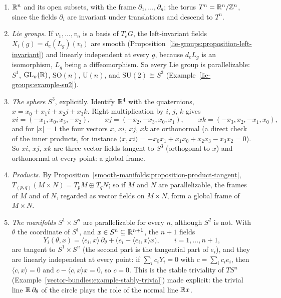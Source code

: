 \begin{example}\label{vector-bundles:example-parallelizable}
\begin{enumerate}
\item $\mathbb{R}^n$ and its open subsets, with the frame $\partial_1, \ldots, \partial_n$; the torus $T^n = \mathbb{R}^n/\mathbb{Z}^n$, since the fields $\partial_i$ are invariant under translations and descend to $T^n$.
\item \emph{Lie groups.} If $v_1, \ldots, v_n$ is a basis of $T_eG$, the left-invariant fields $X_i(g) = d_e(L_g)(v_i)$ are smooth (Proposition~\ref{lie-groups:proposition-left-invariant}) and linearly independent at every
$g$, because $d_eL_g$ is an isomorphism, $L_g$ being a diffeomorphism. So every Lie group is parallelizable: $S^1$, $\mathrm{GL}_n(\mathbb{R})$, $\mathrm{SO}(n)$, $\mathrm{U}(n)$, and $\mathrm{SU}(2) \cong S^3$
(Example~\ref{lie-groups:example-su2}).
\item \emph{The sphere $S^3$}, explicitly. Identify $\mathbb{R}^4$ with the quaternions, $x = x_0 + x_1i + x_2j + x_3k$. Right multiplication by $i$, $j$, $k$ gives
\[
xi = (-x_1, x_0, x_3, -x_2), \qquad xj = (-x_2, -x_3, x_0, x_1), \qquad xk = (-x_3, x_2, -x_1, x_0),
\]
and for $|x| = 1$ the four vectors $x$, $xi$, $xj$, $xk$ are orthonormal (a direct check of the inner products, for instance $\langle x, xi\rangle = -x_0x_1 + x_1x_0 + x_2x_3 - x_3x_2 = 0$). So $xi$, $xj$, $xk$ are
three vector fields tangent to $S^3$ (orthogonal to $x$) and orthonormal at every point: a global frame.
\item \emph{Products.} By Proposition~\ref{smooth-manifolds:proposition-product-tangent}, $T_{(p,q)}(M \times N) = T_pM \oplus T_qN$; so if $M$ and $N$ are parallelizable, the frames of $M$ and of $N$,
regarded as vector fields on $M \times N$, form a global frame of $M \times N$.
\item \emph{The manifolds $S^1 \times S^n$} are parallelizable for every $n$, although $S^2$ is not. With $\theta$ the coordinate of $S^1$, and $x \in S^n \subseteq \mathbb{R}^{n+1}$, the $n + 1$ fields
\[
Y_i(\theta, x) = \langle e_i, x\rangle\,\partial_\theta + \bigl(e_i - \langle e_i, x\rangle x\bigr), \qquad i = 1, \ldots, n + 1,
\]
are tangent to $S^1 \times S^n$ (the second part is the tangential part of $e_i$), and they are linearly independent at every point: if $\sum_ic_iY_i = 0$ with $c = \sum_ic_ie_i$, then $\langle c, x\rangle = 0$ and
$c - \langle c, x\rangle x = 0$, so $c = 0$. This is the stable triviality of $TS^n$ (Example~\ref{vector-bundles:example-stably-trivial}) made explicit: the trivial line $\mathbb{R}\,\partial_\theta$ of the circle plays the role of the
normal line $\mathbb{R} x$.
\end{enumerate}
\end{example}

